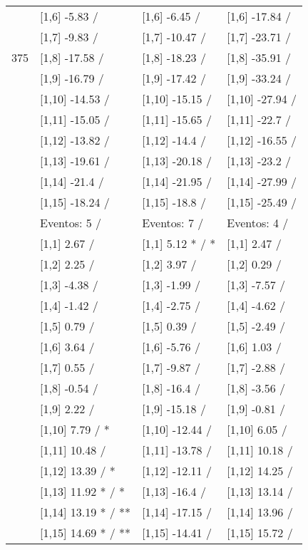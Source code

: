 \begin{table}
\begin{tabular}[t]{llll}
 & {}[1,6] -5.83  / & {}[1,6] -6.45  / & {}[1,6] -17.84  /\\
 & {}[1,7] -9.83  / & {}[1,7] -10.47  / & {}[1,7] -23.71  /\\
375 & {}[1,8] -17.58  / & {}[1,8] -18.23  / & {}[1,8] -35.91  /\\
\addlinespace
 & {}[1,9] -16.79  / & {}[1,9] -17.42  / & {}[1,9] -33.24  /\\
 & {}[1,10] -14.53  / & {}[1,10] -15.15  / & {}[1,10] -27.94  /\\
 & {}[1,11] -15.05  / & {}[1,11] -15.65  / & {}[1,11] -22.7  /\\
 & {}[1,12] -13.82  / & {}[1,12] -14.4  / & {}[1,12] -16.55  /\\
 & {}[1,13] -19.61  / & {}[1,13] -20.18  / & {}[1,13] -23.2  /\\
\addlinespace
 & {}[1,14] -21.4  / & {}[1,14] -21.95  / & {}[1,14] -27.99  /\\
 & {}[1,15] -18.24  / & {}[1,15] -18.8  / & {}[1,15] -25.49  /\\
 & Eventos:  5 / & Eventos:  7 / & Eventos:  4 /\\
 & {}[1,1] 2.67  / & {}[1,1] 5.12 * / * & {}[1,1] 2.47  /\\
 & {}[1,2] 2.25  / & {}[1,2] 3.97  / & {}[1,2] 0.29  /\\
\addlinespace
 & {}[1,3] -4.38  / & {}[1,3] -1.99  / & {}[1,3] -7.57  /\\
 & {}[1,4] -1.42  / & {}[1,4] -2.75  / & {}[1,4] -4.62  /\\
 & {}[1,5] 0.79  / & {}[1,5] 0.39  / & {}[1,5] -2.49  /\\
 & {}[1,6] 3.64  / & {}[1,6] -5.76  / & {}[1,6] 1.03  /\\
 & {}[1,7] 0.55  / & {}[1,7] -9.87  / & {}[1,7] -2.88  /\\
\addlinespace
500 & {}[1,8] -0.54  / & {}[1,8] -16.4  / & {}[1,8] -3.56  /\\
 & {}[1,9] 2.22  / & {}[1,9] -15.18  / & {}[1,9] -0.81  /\\
 & {}[1,10] 7.79  / * & {}[1,10] -12.44  / & {}[1,10] 6.05  /\\
 & {}[1,11] 10.48  / & {}[1,11] -13.78  / & {}[1,11] 10.18  /\\
 & {}[1,12] 13.39  / * & {}[1,12] -12.11  / & {}[1,12] 14.25  /\\
\addlinespace
 & {}[1,13] 11.92 * / * & {}[1,13] -16.4  / & {}[1,13] 13.14  /\\
 & {}[1,14] 13.19 * / ** & {}[1,14] -17.15  / & {}[1,14] 13.96  /\\
 & {}[1,15] 14.69 * / ** & {}[1,15] -14.41  / & {}[1,15] 15.72  /\\
\bottomrule
\end{tabular}
\end{table}
